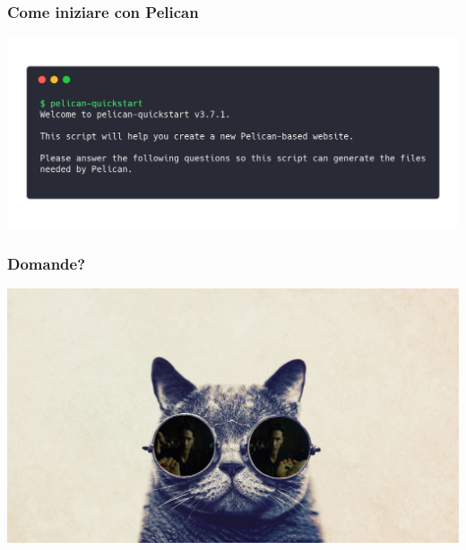 \begin{frame}
  \frametitle{Come iniziare con Pelican}
		\begin{center}
			\includegraphics[scale=0.2]{img/quickstart.png}
		\end{center}  
\end{frame}


\begin{frame}
	\frametitle{Domande?}
	\begin{center}
		\includegraphics[scale=0.15]{img/cat-with-glasses}
	\end{center}
\end{frame}


